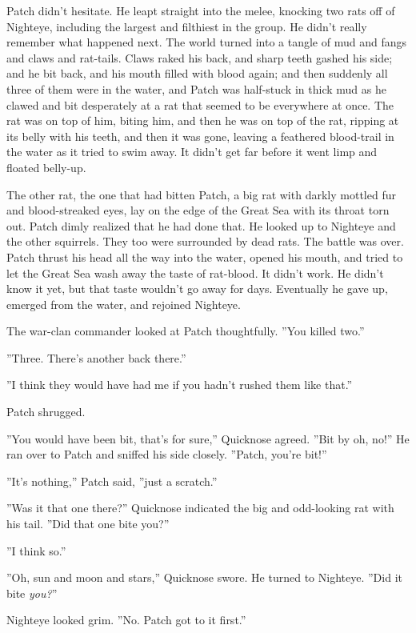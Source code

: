 \documentclass[12pt]{book}
\begin{document}
 Patch didn't hesitate. He leapt straight into the melee, knocking two rats off of Nighteye, including the largest and filthiest in the group. He didn't really remember what happened next. The world turned into a tangle of mud and fangs and claws and rat-tails. Claws raked his back, and sharp teeth gashed his side; and he bit back, and his mouth filled with blood again; and then suddenly all three of them were in the water, and Patch was half-stuck in thick mud as he clawed and bit desperately at a rat that seemed to be everywhere at once. The rat was on top of him, biting him, and then he was on top of the rat, ripping at its belly with his teeth, and then it was gone, leaving a feathered blood-trail in the water as it tried to swim away. It didn't get far before it went limp and floated belly-up.\par
 The other rat, the one that had bitten Patch, a big rat with darkly mottled fur and blood-streaked eyes, lay on the edge of the Great Sea with its throat torn out. Patch dimly realized that he had done that. He looked up to Nighteye and the other squirrels. They too were surrounded by dead rats. The battle was over. Patch thrust his head all the way into the water, opened his mouth, and tried to let the Great Sea wash away the taste of rat-blood. It didn't work. He didn't know it yet, but that taste wouldn't go away for days. Eventually he gave up, emerged from the water, and rejoined Nighteye.\par
 The war-clan commander looked at Patch thoughtfully. ''You killed two.''\par
 ''Three. There's another back there.''\par
 ''I think they would have had me if you hadn't rushed them like that.''\par
 Patch shrugged.\par
 ''You would have been bit, that's for sure,'' Quicknose agreed. ''Bit by %
 oh, no!'' He ran over to Patch and sniffed his side closely. ''Patch, you're bit!''\par
 ''It's nothing,'' Patch said, ''just a scratch.''\par
 ''Was it that one there?'' Quicknose indicated the big and odd-looking rat with his tail. ''Did that one bite you?''\par
 ''I think so.''\par
 ''Oh, sun and moon and stars,'' Quicknose swore. He turned to Nighteye. ''Did it bite {\it you?}''\par
 Nighteye looked grim. ''No. Patch got to it first.''\par
\end{document}
